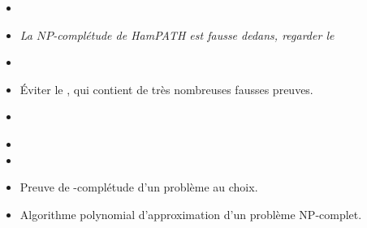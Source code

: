 \documentclass{agregfiche}
\begin{document}
\begin{itemize}
    \item 
\item 
\textit{La $NP$-complétude de HamPATH est fausse dedans, regarder le }
\item 
\item Éviter le , qui contient de très nombreuses
  fausses preuves.
\item 
\end{itemize}

\secdev

\begin{itemize}
\item 
\item 
\item Preuve de \NP-complétude d'un problème au choix.
\item Algorithme polynomial d'approximation d'un problème NP-complet.
\end{itemize}
\end{document}
